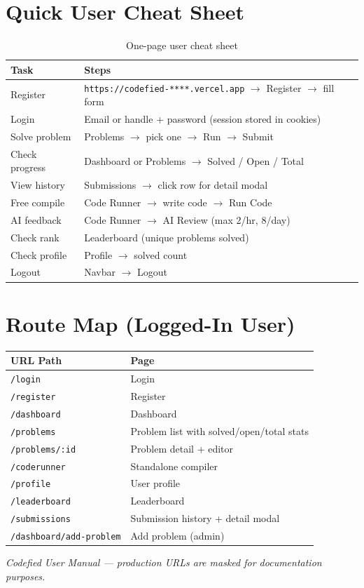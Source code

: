 \documentclass[11pt,a4paper]{article}
\newcommand{\appurl}{\texttt{https://codefied-****.vercel.app}}
\begin{document}
\appendix
\section{Quick User Cheat Sheet}

\begin{table}[h]
\centering
\small
\begin{tabular}{@{}ll@{}}
\toprule
\textbf{Task} & \textbf{Steps} \\
\midrule
Register & \appurl{} $\rightarrow$ Register $\rightarrow$ fill form \\
Login    & Email or handle + password (session stored in cookies) \\
Solve problem & Problems $\rightarrow$ pick one $\rightarrow$ Run $\rightarrow$ Submit \\
Check progress & Dashboard or Problems $\rightarrow$ Solved / Open / Total \\
View history  & Submissions $\rightarrow$ click row for detail modal \\
Free compile  & Code Runner $\rightarrow$ write code $\rightarrow$ Run Code \\
AI feedback   & Code Runner $\rightarrow$ AI Review (max 2/hr, 8/day) \\
Check rank    & Leaderboard (unique problems solved) \\
Check profile & Profile $\rightarrow$ solved count \\
Logout        & Navbar $\rightarrow$ Logout \\
\bottomrule
\end{tabular}
\caption{One-page user cheat sheet}
\end{table}

\section{Route Map (Logged-In User)}

\begin{table}[h]
\centering
\small
\begin{tabular}{@{}ll@{}}
\toprule
\textbf{URL Path} & \textbf{Page} \\
\midrule
\texttt{/login}              & Login \\
\texttt{/register}            & Register \\
\texttt{/dashboard}          & Dashboard \\
\texttt{/problems}            & Problem list with solved/open/total stats \\
\texttt{/problems/:id}       & Problem detail + editor \\
\texttt{/coderunner}          & Standalone compiler \\
\texttt{/profile}            & User profile \\
\texttt{/leaderboard}        & Leaderboard \\
\texttt{/submissions}        & Submission history + detail modal \\
\texttt{/dashboard/add-problem} & Add problem (admin) \\
\bottomrule
\end{tabular}
\end{table}

\vfill
\begin{center}
\small\textit{Codefied User Manual --- production URLs are masked for documentation purposes.}
\end{center}
\end{document}
